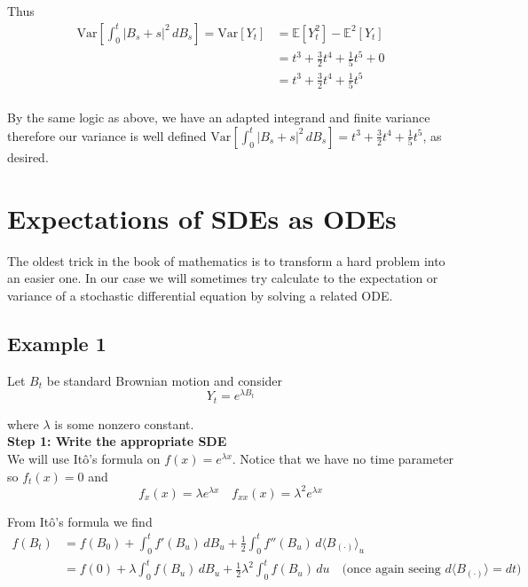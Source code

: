 \documentclass[12pt]{article}
\newlength\tindent
\renewcommand{\indent}{\hspace*{\tindent}}
\begin{document}
Thus
\begin{align*}
	\mathrm{Var}\left[\int^t_0|B_s+s|^2\,dB_s\right] = \mathrm{Var}[Y_t] &= \mathbb E[Y_t^2] - \mathbb E^2[Y_t] \\
	&= t^3 + \frac{3}{2}t^4 + \frac{1}{5}t^5 + 0 \\
	&= t^3 + \frac{3}{2}t^4 + \frac{1}{5}t^5 \\
\end{align*}

\indent By the same logic as above, we have an adapted integrand and finite variance therefore our variance is well defined $\text{Var}\left[\int^t_0|B_s+s|^2\,dB_s\right] = t^3 + \frac{3}{2}t^4 + \frac{1}{5}t^5$, as desired.


\section{Expectations of SDEs as ODEs}

\indent The oldest trick in the book of mathematics is to transform a hard problem into an easier one. In our case we will sometimes try calculate to the expectation or variance of a stochastic differential equation by solving a related ODE.

\subsection{Example 1}

Let $B_t$ be standard Brownian motion and consider
\begin{equation*}
	Y_t = e^{\lambda B_t}
\end{equation*}

where $\lambda$ is some nonzero constant. \\

{\bf Step 1: Write the appropriate SDE} \\

\indent We will use It\^{o}'s formula on $f(x) = e^{\lambda x}$. Notice that we have no time parameter so $f_t(x) = 0$ and
\begin{equation*}
	f_x(x) = \lambda e^{\lambda x} \quad f_{xx}(x) = \lambda^2 e^{\lambda x}
\end{equation*}

From It\^{o}'s formula we find
\begin{align*}
	f(B_t) &= f(B_0) + \int^t_0f'(B_u)\,dB_u + \frac{1}{2}\int^t_0f''(B_u)\,d\langle B_{(\cdot)}\rangle_u \\
	&= f(0) + \lambda\int^t_0 f(B_u)\,dB_u + \frac{1}{2}\lambda^2\int^t_0 f(B_u)\,du \quad \text{(once again seeing $d\langle B_{(\cdot)}\rangle = dt$)}
\end{align*}
\end{document}
